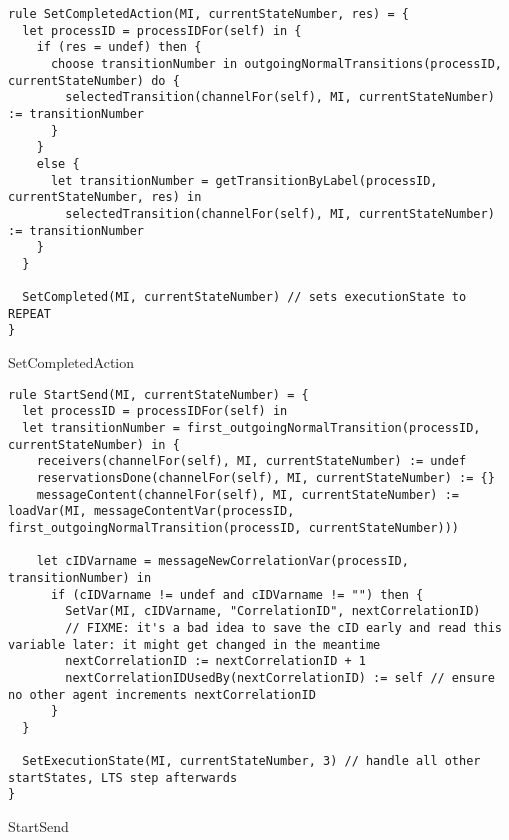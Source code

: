 \begin{listing}[H]
\begin{verbatim}
rule SetCompletedAction(MI, currentStateNumber, res) = {
  let processID = processIDFor(self) in {
    if (res = undef) then {
      choose transitionNumber in outgoingNormalTransitions(processID, currentStateNumber) do {
        selectedTransition(channelFor(self), MI, currentStateNumber) := transitionNumber
      }
    }
    else {
      let transitionNumber = getTransitionByLabel(processID, currentStateNumber, res) in
        selectedTransition(channelFor(self), MI, currentStateNumber) := transitionNumber
    }
  }

  SetCompleted(MI, currentStateNumber) // sets executionState to REPEAT
}
\end{verbatim}
\caption{SetCompletedAction}
\label{lst:asm:SetCompletedAction}
\end{listing}





\begin{listing}[H]
\begin{verbatim}
rule StartSend(MI, currentStateNumber) = {
  let processID = processIDFor(self) in
  let transitionNumber = first_outgoingNormalTransition(processID, currentStateNumber) in {
    receivers(channelFor(self), MI, currentStateNumber) := undef
    reservationsDone(channelFor(self), MI, currentStateNumber) := {}
    messageContent(channelFor(self), MI, currentStateNumber) := loadVar(MI, messageContentVar(processID, first_outgoingNormalTransition(processID, currentStateNumber)))

    let cIDVarname = messageNewCorrelationVar(processID, transitionNumber) in
      if (cIDVarname != undef and cIDVarname != "") then {
        SetVar(MI, cIDVarname, "CorrelationID", nextCorrelationID)
        // FIXME: it's a bad idea to save the cID early and read this variable later: it might get changed in the meantime
        nextCorrelationID := nextCorrelationID + 1
        nextCorrelationIDUsedBy(nextCorrelationID) := self // ensure no other agent increments nextCorrelationID
      }
  }

  SetExecutionState(MI, currentStateNumber, 3) // handle all other startStates, LTS step afterwards
}
\end{verbatim}
\caption{StartSend}
\label{lst:asm:StartSend}
\end{listing}




